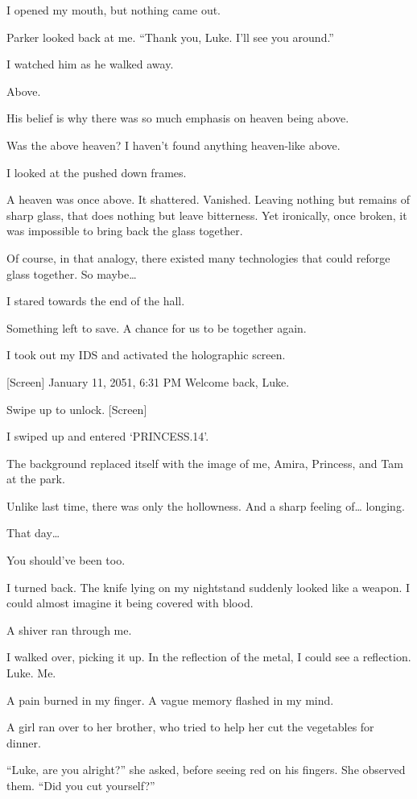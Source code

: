 I opened my mouth, but nothing came out.

Parker looked back at me. “Thank you, Luke. I’ll see you around.”

I watched him as he walked away.

Above.

His belief is why there was so much emphasis on heaven being above.

Was the above heaven? I haven’t found anything heaven-like above.

I looked at the pushed down frames.

A heaven was once above. It shattered. Vanished. Leaving nothing but remains of sharp glass, that does nothing but leave bitterness. Yet ironically, once broken, it was impossible to bring back the glass together.

Of course, in that analogy, there existed many technologies that could reforge glass together. So maybe…

I stared towards the end of the hall.

Something left to save. A chance for us to be together again.

I took out my IDS and activated the holographic screen.

[Screen]
January 11, 2051, 6:31 PM
Welcome back, Luke. 

Swipe up to unlock.
[Screen]

I swiped up and entered ‘PRINCESS.14’.

The background replaced itself with the image of me, Amira, Princess, and Tam at the park.

Unlike last time, there was only the hollowness. And a sharp feeling of… longing.

That day…

You should’ve been too.

I turned back. The knife lying on my nightstand suddenly looked like a weapon. I could almost imagine it being covered with blood. 

A shiver ran through me.

I walked over, picking it up. In the reflection of the metal, I could see a reflection. Luke. Me.

A pain burned in my finger. A vague memory flashed in my mind. 

A girl ran over to her brother, who tried to help her cut the vegetables for dinner.

“Luke, are you alright?” she asked, before seeing red on his fingers. She observed them. “Did you cut yourself?”


